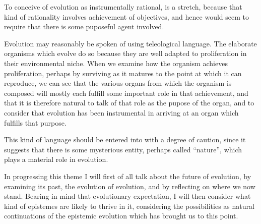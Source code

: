 To conceive of evolution as instrumentally rational, is a stretch, because that kind of rationality involves achievement of objectives, and hence would seem to require that there is some puposeful agent involved.

Evolution may reasonably be spoken of using teleological language.
The elaborate organisms which evolve do so because they are well adapted to proliferation in their environmental niche.
When we examine how the organism achieves proliferation, perhaps by surviving as it matures to the point at which it can reproduce, we can see that the various organs from which the organism is composed will mostly each fulfill some important role in that achievement, and that it is therefore natural to talk of that role as the pupose of the organ, and to consider that evolution has been instrumental in arriving at an organ which fulfills that purpose.

This kind of language should be entered into with a degree of caution, since it suggests that there is some mysterious entity, perhaps called ``nature'', which plays a material role in evolution.

In progressing this theme I will first of all talk about the future of evolution, by examining its past, the evolution of evolution, and by reflecting on where we now stand.
Bearing in mind that evolutionary expectation, I will then consider what kind of epistemes are likely to thrive in it, considering the possibilities as natural continuations of the epistemic evolution which has brought us to this point.

